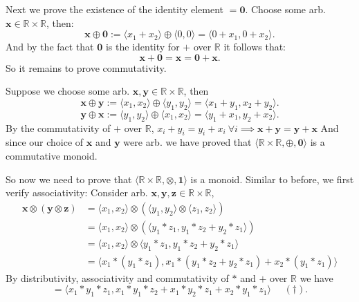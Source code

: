 \documentclass[a4paper]{article}
\begin{document}
Next we prove the existence of the identity element $=\bm{0}$.
Choose some arb. $\bm{x}\in \mathbb{R} \times \mathbb{R}$,
then:
\[
\bm{x} \oplus \bm{0} := \langle x_1 + x_2 \rangle \oplus \langle 0, 0 \rangle = \langle 0 + x_1, 0 + x_2 \rangle
.\]
And by the fact that $\bm{0}$ is the identity for $+$ over $\mathbb{R}$ it follows that:
\[
\bm{x} + \bm{0} = \bm{x} = \bm{0} + \bm{x}
.\]
So it remains to prove commutativity.

Suppose we choose some arb. $\bm{x}, \bm{y} \in \mathbb{R} \times \mathbb{R}$,
then 
\[
\bm{x} \oplus \bm{y} := \langle x_1, x_2 \rangle \oplus \langle y_1, y_2 \rangle = \langle x_1 + y_1, x_2 + y_2 \rangle
.\]
\[
\bm{y} \oplus \bm{x} := \langle y_1, y_2 \rangle \oplus \langle x_1, x_2 \rangle = \langle y_1 + x_1, y_2 + x_2 \rangle
.\]
By the commutativity of $+$ over $\mathbb{R}$, $x_i + y_i = y_i + x_i ~\forall i \implies \bm{x} + \bm{y} = \bm{y} + \bm{x}$
And since our choice of $\bm{x}$ and $\bm{y}$ were arb. we have proved that $\langle \mathbb{R}\times\mathbb{R}, \oplus, \bm{0} \rangle$ 
is a commutative monoid.


So now we need to prove that $\langle \mathbb{R}\times\mathbb{R}, \otimes, \bm{1} \rangle$ is a monoid.
Similar to before, we first verify associativity:
Consider arb. $\bm{x}, \bm{y}, \bm{z} \in \mathbb{R}\times\mathbb{R}$,
\begin{align*}
     \bm{x} \otimes (\bm{y} \otimes \bm{z}) &=  \langle x_1, x_2 \rangle \otimes (\langle y_1, y_2 \rangle \otimes \langle z_1, z_2 \rangle)\\ 
 &=  \langle x_1, x_2 \rangle \otimes (\langle y_1 * z_1, y_1 * z_2 + y_2 * z_1 \rangle)\\ 
 &=  \langle x_1, x_2 \rangle \otimes \langle y_1 * z_1, y_1 * z_2 + y_2 * z_1 \rangle\\ 
 &=  \langle x_1 * (y_1 * z_1), x_1 * (y_1 * z_2 + y_2 * z_1) + x_2 * (y_1 * z_1) \rangle
\end{align*}
By distributivity, associativity and commutativity of $*$  and $+$ over  $\mathbb{R}$ we have
\[
= \langle x_1 * y_1 * z_1, x_1 * y_1 * z_2 + x_1 * y_2 * z_1 + x_2 * y_1 * z_1\rangle  ~ ~ ~ ~ ~ ~ (\dag)
.\]
\end{document}
